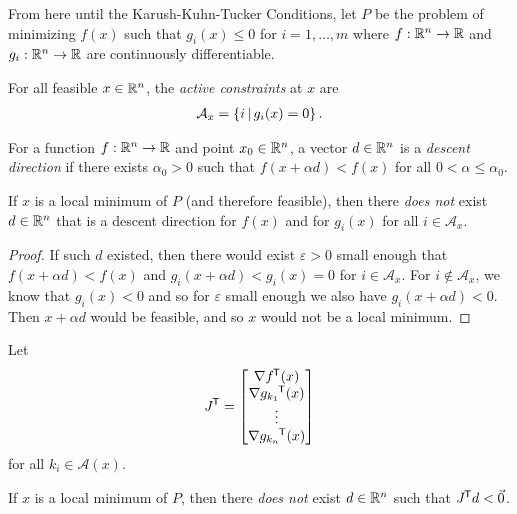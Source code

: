 \begin{rmk}
    From here until the Karush-Kuhn-Tucker Conditions, let $P$ be the problem of minimizing $f(x)$ such that $g_i(x) \leq 0$ for $i = 1, \ldots, m$ where $f: \mathbb{R}^n \to \mathbb{R}$ and $g_i: \mathbb{R}^n \to \mathbb{R}$ are continuously differentiable.
\end{rmk}

\begin{defn}
    For all feasible $x \in \mathbb{R}^n$, the \emph{active constraints} at $x$ are
    \begin{align*}
        \mathcal{A}_x = \left\{i \,\middle|\, g_i(x) = 0\right\}.
    \end{align*}
\end{defn}

\begin{defn}
    For a function $f: \mathbb{R}^n \to \mathbb{R}$ and point $x_0 \in \mathbb{R}^n$, a vector $d \in \mathbb{R}^n$ is a \emph{descent direction} if there exists $\alpha_0 > 0$ such that $f(x + \alpha d) < f(x)$ for all $0 < \alpha \leq \alpha_0$.
\end{defn}

\begin{lemma}\label{kkt-lemma-1}
    If $x$ is a local minimum of $P$ (and therefore feasible), then there \emph{does not} exist $d \in \mathbb{R}^n$ that is a descent direction for $f(x)$ and for $g_i(x)$ for all $i \in \mathcal{A}_x$.
\end{lemma}

\begin{proof}
    If such $d$ existed, then there would exist $\varepsilon > 0$ small enough that $f(x + \alpha d) < f(x)$ and $g_i(x + \alpha d) < g_i(x) = 0$ for $i \in \mathcal{A}_x$. For $i \notin \mathcal{A}_x$, we know that $g_i(x) < 0$ and so for $\varepsilon$ small enough we also have $g_i(x + \alpha d) < 0$. Then $x + \alpha d$ would be feasible, and so $x$ would not be a local minimum.
\end{proof}

\begin{lemma}\label{kkt-lemma-2}
    Let
    \begin{align*}
        {J}^{\mkern-1.5mu\mathsf{T}} = \begin{bmatrix}
            \nabla {f}^{\mkern-1.5mu\mathsf{T}}(x) \\ \nabla {g_{k_1}}^{\mkern-1.5mu\mathsf{T}}(x) \\ \vdots \\ \nabla {g_{k_n}}^{\mkern-1.5mu\mathsf{T}}(x)
        \end{bmatrix}
    \end{align*}
    for all $k_i \in \mathcal{A}(x)$.

    If $x$ is a local minimum of $P$, then there \emph{does not} exist $d \in \mathbb{R}^n$ such that ${J}^{\mkern-1.5mu\mathsf{T}}d < \vec{0}$.
\end{lemma}

